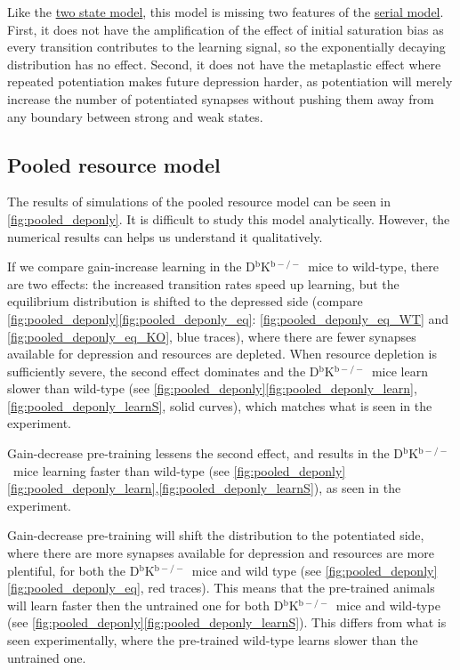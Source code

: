 \documentclass[12pt]{article}
\newcommand{\KO}{D$^\mathrm{b}$K$^{\mathrm{b}-/-}$}
\newcommand{\lmax}{_{\text{max}}}
\newcommand{\lmin}{_{\text{min}}}
\begin{document}
Like the \hyperref[sec:binary]{two state model}, this model is missing two features of the \hyperref[sec:multistate]{serial model}.
First, it does not have the amplification of the effect of initial saturation bias as every transition contributes to the learning signal, so the exponentially decaying distribution has no effect.
Second, it does not have the metaplastic effect where repeated potentiation makes future depression harder, as potentiation will merely increase the number of potentiated synapses without pushing them away from any boundary between strong and weak states.



\subsection{Pooled resource model}\label{sec:pooled}
%
%
%



The results of simulations of the pooled resource model can be seen in \autoref{fig:pooled_deponly}.
It is difficult to study this model analytically.
However, the numerical results can helps us understand it qualitatively.

If we compare gain-increase learning in the \KO\ mice to wild-type, there are two effects: the increased transition rates speed up learning, but the equilibrium distribution is shifted to the depressed side (compare \autoref{fig:pooled_deponly}\ref{fig:pooled_deponly_eq}: \ref{fig:pooled_deponly_eq_WT} and \ref{fig:pooled_deponly_eq_KO}, blue traces), where there are fewer synapses available for depression and resources are depleted.
When resource depletion is sufficiently severe, the second effect dominates and the \KO\ mice learn slower than wild-type (see \autoref{fig:pooled_deponly}\ref{fig:pooled_deponly_learn},\ref{fig:pooled_deponly_learnS}, solid curves), which matches what is seen in the experiment.

Gain-decrease pre-training lessens the second effect, and results in the \KO\ mice learning faster than wild-type (see \autoref{fig:pooled_deponly}\ref{fig:pooled_deponly_learn},\ref{fig:pooled_deponly_learnS}), as seen in the experiment.

Gain-decrease pre-training will shift the distribution to the potentiated side, where there are more synapses available for depression and resources are more plentiful, for both the \KO\ mice and wild type (see \autoref{fig:pooled_deponly}\ref{fig:pooled_deponly_eq}, red traces).
This means that the pre-trained animals will learn faster then the untrained one for both \KO\ mice and wild-type (see \autoref{fig:pooled_deponly}\ref{fig:pooled_deponly_learnS}).
This differs from what is seen experimentally, where the pre-trained wild-type learns slower than the untrained one.
\end{document}
